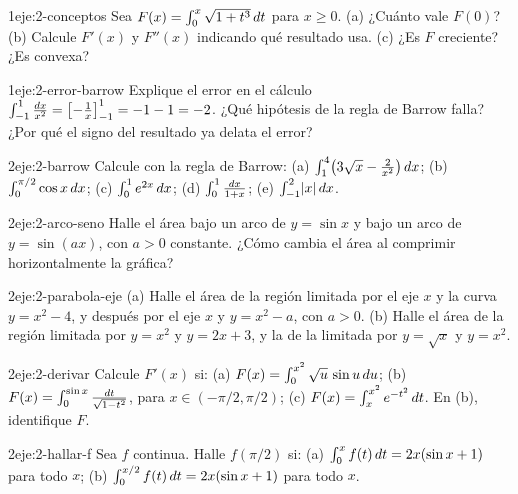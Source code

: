 \begin{ejercicio}{1}{eje:2-conceptos}
Sea $F(x)=\int_0^{x}\sqrt{1+t^{3}}\mathop{}\!d t$ para $x\ge0$. (a) ¿Cuánto vale $F(0)$? (b) Calcule $F'(x)$ y $F''(x)$ indicando qué resultado usa. (c) ¿Es $F$ creciente? ¿Es convexa?
\end{ejercicio}

\begin{ejercicio}{1}{eje:2-error-barrow}
Explique el error en el cálculo $\int_{-1}^{1}\frac{\mathop{}\!d x}{x^{2}}=\bigl[-\frac1x\bigr]_{-1}^{1}=-1-1=-2$. ¿Qué hipótesis de la regla de Barrow falla? ¿Por qué el signo del resultado ya delata el error?
\end{ejercicio}

\begin{ejercicio}{2}{eje:2-barrow}
Calcule con la regla de Barrow: (a) $\int_1^4\bigl(3\sqrt x-\frac{2}{x^{2}}\bigr)\mathop{}\!d x$; (b) $\int_0^{\pi/2}\cos x\mathop{}\!d x$; (c) $\int_0^1e^{2x}\mathop{}\!d x$; (d) $\int_0^1\frac{\mathop{}\!d x}{1+x}$; (e) $\int_{-1}^{2}\lvert x\rvert\mathop{}\!d x$.
\end{ejercicio}

\begin{ejercicio}{2}{eje:2-arco-seno}
Halle el área bajo un arco de $y=\sin x$ y bajo un arco de $y=\sin(ax)$, con $a>0$ constante. ¿Cómo cambia el área al comprimir horizontalmente la gráfica?
\end{ejercicio}

\begin{ejercicio}{2}{eje:2-parabola-eje}
(a) Halle el área de la región limitada por el eje $x$ y la curva $y=x^{2}-4$, y después por el eje $x$ y $y=x^{2}-a$, con $a>0$. (b) Halle el área de la región limitada por $y=x^{2}$ y $y=2x+3$, y la de la limitada por $y=\sqrt x$ y $y=x^{2}$.
\end{ejercicio}

\begin{ejercicio}{2}{eje:2-derivar}
Calcule $F'(x)$ si: (a) $F(x)=\int_0^{x^{2}}\sqrt{u}\,\sin u\mathop{}\!d u$; (b) $F(x)=\int_0^{\sin x}\frac{\mathop{}\!d t}{\sqrt{1-t^{2}}}$, para $x\in(-\pi/2,\pi/2)$; (c) $F(x)=\int_x^{x^{2}}e^{-t^{2}}\mathop{}\!d t$. En (b), identifique $F$.
\end{ejercicio}

\begin{ejercicio}{2}{eje:2-hallar-f}
Sea $f$ continua. Halle $f(\pi/2)$ si: (a) $\int_0^{x}f(t)\mathop{}\!d t=2x(\sin x+1)$ para todo $x$; (b) $\int_0^{x/2}f(t)\mathop{}\!d t=2x(\sin x+1)$ para todo $x$.
\end{ejercicio}

